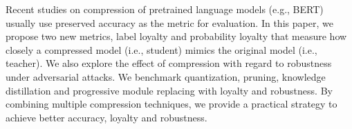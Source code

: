 Recent studies on compression of pretrained language models (e.g., BERT) usually use preserved accuracy as the metric for evaluation. In this paper, we propose two new metrics, label loyalty and probability loyalty that measure how closely a compressed model (i.e., student) mimics the original model (i.e., teacher). We also explore the effect of compression with regard to robustness under adversarial attacks. We benchmark quantization, pruning, knowledge distillation and progressive module replacing with loyalty and robustness. By combining multiple compression techniques, we provide a practical strategy to achieve better accuracy, loyalty and robustness.
